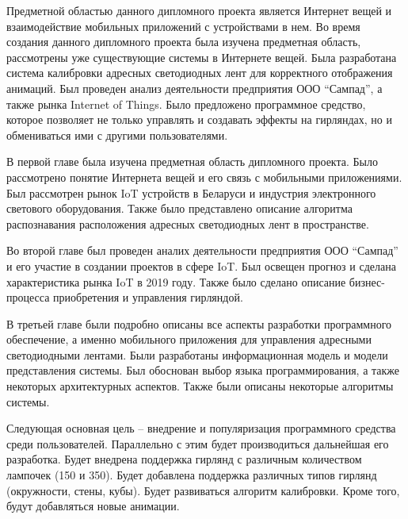 Предметной областью данного дипломного проекта является Интернет вещей и взаимодействие мобильных приложений с устройствами в нем. Во время создания данного дипломного проекта была изучена предметная область, рассмотрены уже существующие системы в Интернете вещей. Была разработана система калибровки адресных светодиодных лент для корректного отображения анимаций. Был проведен анализ деятельности предприятия ООО \enquote{Сампад}, а также рынка Internet of Things. Было предложено программное средство, которое позволяет не только управлять и создавать эффекты на гирляндах, но и обмениваться ими с другими пользователями.%

В первой главе была изучена предметная область дипломного проекта. Было рассмотрено понятие Интернета вещей и его связь с мобильными приложениями. Был рассмотрен рынок IoT устройств в Беларуси и индустрия электронного светового оборудования. Также было представлено описание алгоритма распознавания расположения адресных светодиодных лент в пространстве.

Во второй главе был проведен аналих деятельности предприятия ООО \enquote{Сампад} и его участие в создании проектов в сфере IoT. Был освещен прогноз и сделана характеристика рынка IoT в 2019 году. Также было сделано описание бизнес-процесса приобретения и управления гирляндой.

В третьей главе были подробно описаны все аспекты разработки программного обеспечение, а именно мобильного приложения для управления адресными светодиодными лентами. Были разработаны информационная модель и модели представления системы. Был обоснован выбор языка программирования, а также некоторых архитектурных аспектов. Также были описаны некоторые алгоритмы системы.

Следующая основная цель -- внедрение и популяризация программного средства среди пользователей. Параллельно с этим будет производиться дальнейшая его разработка. Будет внедрена поддержка гирлянд с различным количеством лампочек (150 и 350). Будет добавлена поддержка различных типов гирлянд (окружности, стены, кубы). Будет развиваться алгоритм калибровки. Кроме того, будут добавляться новые анимации.
